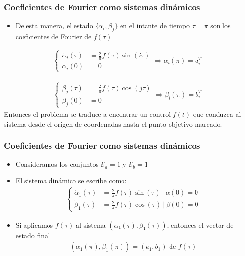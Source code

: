\begin{frame}
    \frametitle{Coeficientes de Fourier como sistemas dinámicos}
    
    \begin{itemize}
        \item De esta manera, el estado $\{ \alpha_{i},\beta_{j} \}$ en el intante de tiempo $\tau = \pi$ son los coeficientes de Fourier de $f(\tau) $
    \end{itemize}
    \begin{gather}
        \begin{cases} \label{ode}
            \dot{\alpha_i}(\tau) & = \frac{2}{\pi}f(\tau)\sin(i\tau) \\  
            \alpha_i(0) & = 0       
        \end{cases}
        \Rightarrow 
        \alpha_i(\pi) = a_i^T
    \end{gather}
    
    \begin{gather}
        \begin{cases} 
            \dot{\beta}_j(\tau) & = \frac{2}{\pi}f(\tau)\cos(j\tau) \\  
            \beta_j(0) & = 0       
        \end{cases}
        \Rightarrow 
        \beta_i(\pi) = b_i^T
    \end{gather}
    Entonces el problema se traduce a encontrar un control $f(t)$ que conduzca al sistema desde el origen de coordenadas hasta el punto objetivo marcado.
\end{frame}
\begin{frame}
    \frametitle{Coeficientes de Fourier como sistemas dinámicos}
    
    \begin{itemize}
        \item Consideramos los conjuntos $\mathcal{E}_a = {1}$ y $\mathcal{E}_b = {1}$
        \item El sistema dinámico se escribe como:
        \begin{gather}
            \begin{cases} 
                \dot{\alpha}_1(\tau) & = \frac{2}{\pi}f(\tau)\sin(\tau) \ | \  \alpha(0) = 0\\
                \dot{\beta}_1(\tau) & = \frac{2}{\pi}f(\tau)\cos(\tau)  \ | \  \beta(0) = 0
            \end{cases}  
        \end{gather}

        \item Si aplicamos $f(\tau)$ al sistema $(\alpha_1(\tau),\beta_1(\tau))$, entonces el vector de estado final 
        \begin{gather}
            (\alpha_1(\pi),\beta_1(\pi)) = (a_1,b_1) \text{ de } f(\tau)
        \end{gather}
    \end{itemize}
\end{frame}

